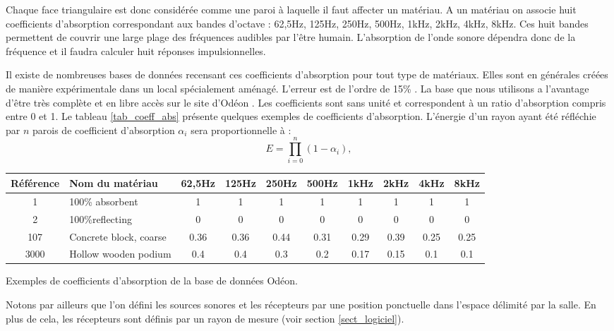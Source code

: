 Chaque face triangulaire est donc considérée comme une paroi à laquelle il faut affecter un matériau. A un matériau on associe huit coefficients d'absorption correspondant aux bandes d'octave : 62,5Hz, 125Hz, 250Hz, 500Hz, 1kHz, 2kHz, 4kHz, 8kHz. Ces huit bandes permettent de couvrir une large plage des fréquences audibles par l'être humain. L'absorption de l'onde sonore dépendra donc de la fréquence et il faudra calculer huit réponses impulsionnelles. 

Il existe de nombreuses bases de données recensant ces coefficients d'absorption pour tout type de matériaux. Elles sont en générales créées de manière expérimentale dans un local spécialement aménagé. L'erreur est de l'ordre de 15\% \cite[]{acouphile}. La base que nous utilisons a l'avantage d'être très complète et en libre accès sur le site d'Odéon \cite[Materials]{odeon}. Les coefficients sont sans unité et correspondent à un ratio d'absorption compris entre 0 et 1. Le tableau \ref{tab_coeff_abs} présente quelques exemples de coefficients d'absorption. L'énergie d'un rayon ayant été réfléchie par $n$ parois de coefficient d'absorption $\alpha_i$ sera proportionnelle à :
\begin{equation} \label{eq_coeff_abs}
E = \prod_{i=0}^n (1-\alpha_i),
\end{equation}
%
\begin{tableth}
\footnotesize
	\begin{tabular}{| c | m{2.5cm} | *{8}{c|}}
		\hline
		Référence & Nom du matériau & 62,5Hz & 125Hz & 250Hz & 500Hz & 1kHz & 2kHz & 4kHz & 8kHz \\
		  \hline
		  \hline
		   1 & 100\% absorbent & 1 & 1 & 1 & 1 & 1 & 1 & 1 & 1 \\
		   \hline
		2 & 100\%reflecting & 0 & 0 & 0 & 0 & 0 & 0 & 0 & 0 \\
		   \hline
		107 & Concrete block, coarse\footnotemark & 0.36 & 0.36 & 0.44 & 0.31 & 0.29 & 0.39 & 0.25 & 0.25 \\
		   \hline
		3000 & Hollow wooden podium\footnotemark & 0.4 & 0.4 & 0.3 & 0.2 & 0.17 & 0.15 & 0.1 & 0.1 \\
	     \hline
	 \end{tabular}
	\caption{Exemples de coefficients d'absorption de la base de données Odéon.}
	 \label{tab_coeff_abs}
\end{tableth}
\addtocounter{footnote}{-1}
\addtocounter{footnote}{1}
%


Notons par ailleurs que l'on défini les sources sonores et les récepteurs par une position ponctuelle dans l'espace délimité par la salle. En plus de cela, les récepteurs sont définis par un rayon de mesure (voir section \ref{sect_logiciel}). %

